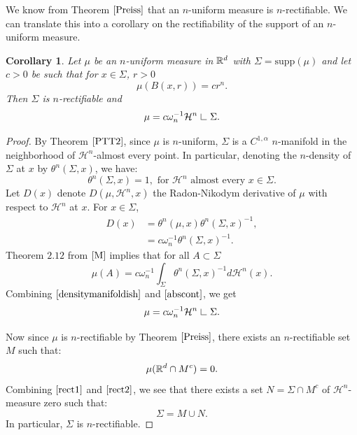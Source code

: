 \documentclass[11pt]{article}
\newtheorem{corollary}[theorem]{Corollary}
\theoremstyle{definition}
\theoremstyle{remark}
\numberwithin{equation}{section}
\newcommand{\res}{\hbox{{\vrule height .22cm}{\leaders\hrule\hskip .2cm}}}
\def\res{\hbox{ {\vrule height .22cm}{\leaders\hrule\hskip.2cm} } }
\begin{document}
We know from Theorem $\ref{Preiss}$ that an $n$-uniform measure is $n$-rectifiable. We can translate this into a corollary on the rectifiability of the support of an $n$-uniform measure.

\begin{corollary}\label{supportrect}
Let $\mu$ be an $n$-uniform measure in $\mathbb{R}^{d}$ with $\Sigma=\mbox{supp}(\mu)$ and let $c>0$ be such that for $x \in \Sigma$, $r>0$ \begin{equation}
\mu(B(x,r))=cr^{n}.
\end{equation} 
Then  $\Sigma$ is $n$-rectifiable and 
\begin{equation}\label{supportunifmeasure}
\mu = c  \omega_{n}^{-1}\mathcal{H}^{n} \res \Sigma.
\end{equation}
\end{corollary}
\begin{proof}
By Theorem $\ref{PTT2}$, since $\mu$ is $n$-uniform, $\Sigma$ is a $C^{1,\alpha}$ $n$-manifold in the neighborhood of $\mathcal{H}^{n}$-almost every point. In particular, denoting the $n$-density of $\Sigma$ at $x$ by $\theta^{n}(\Sigma,x)$, we  have:
\begin{equation}\label{densitymanifoldish}
\theta^{n}(\Sigma,x)=1, \mbox{ for } \mathcal{H}^{n} \mbox{ almost every } x \in \Sigma.
\end{equation}
Let $D(x)$ denote $D(\mu, \mathcal{H}^{n}, x)$ the Radon-Nikodym derivative of $\mu$ with respect to $\mathcal{H}^n$ at $x$.
For $x \in \Sigma$, 
\begin{align*}
D(x) &=\theta^{n}(\mu,x) \theta^{n}(\Sigma,x)^{-1}, \\
        &=c \omega_{n}^{-1}\theta^{n}(\Sigma,x)^{-1}.
  \end{align*}
Theorem $2.12$ from $\cite{M}$ implies that for all $A \subset \Sigma$ 
\begin{equation}\label{abscont}
\mu(A)=c \omega_{n}^{-1} \int_{\Sigma} \theta^{n}(\Sigma,x)^{-1} d\mathcal{H}^{n}(x).
\end{equation}
Combining $\eqref{densitymanifoldish}$ and $\eqref{abscont}$, we get
 \begin{equation}\label{rect1}
\mu = c \omega_{n}^{-1} \mathcal{H}^{n} \res \Sigma.
\end{equation}

Now since $\mu$ is $n$-rectifiable by Theorem $\ref{Preiss}$, there exists an $n$-rectifiable set $M$ such that:
\begin{equation}\label{rect2}
\mu(\mathbb{R}^{d} \cap M^{c})=0.
\end{equation}
Combining $\eqref{rect1}$ and $\eqref{rect2}$, we see that there exists a set $N=\Sigma \cap M^{c}$ of $\mathcal{H}^{n}$-measure zero such that:
$$\Sigma= M \cup N.$$
In particular, $\Sigma$ is $n$-rectifiable.

\end{proof}
\end{document}
